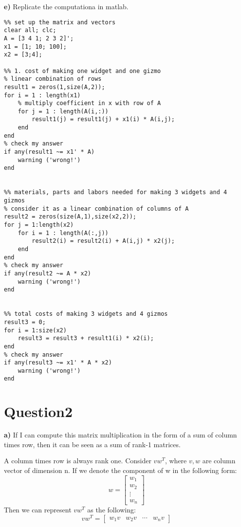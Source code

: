\documentclass[paper=a4, fontsize=11pt]{scrartcl} %
\numberwithin{equation}{section} %
\numberwithin{figure}{section} %
\numberwithin{table}{section} %
\begin{document}
\newpage
\textbf{e)} Replicate the computationa in matlab. 
\begin{lstlisting} 
%% set up the matrix and vectors
clear all; clc;
A = [3 4 1; 2 3 2]';
x1 = [1; 10; 100];
x2 = [3;4];

%% 1. cost of making one widget and one gizmo
% linear combination of rows
result1 = zeros(1,size(A,2));
for i = 1 : length(x1)
    % multiply coefficient in x with row of A
    for j = 1 : length(A(i,:))
        result1(j) = result1(j) + x1(i) * A(i,j);
    end
end
% check my answer
if any(result1 ~= x1' * A)
    warning ('wrong!')
end


%% materials, parts and labors needed for making 3 widgets and 4 gizmos
% consider it as a linear combination of columns of A
result2 = zeros(size(A,1),size(x2,2));
for j = 1:length(x2)
    for i = 1 : length(A(:,j))
        result2(i) = result2(i) + A(i,j) * x2(j);
    end
end
% check my answer
if any(result2 ~= A * x2)
    warning ('wrong!')
end


%% total costs of making 3 widgets and 4 gizmos
result3 = 0;
for i = 1:size(x2)
    result3 = result3 + result1(i) * x2(i);
end
% check my answer
if any(result3 ~= x1' * A * x2)
    warning ('wrong!')
end

\end{lstlisting} 

\newpage
\section*{Question2}

\textbf{a)} If I can compute this matrix multiplication in the form of a sum of column times row, then it can be seen as a sum of rank-1 matrices. 

A column times row is always rank one. Consider $v w^T$, where $v, w$ are column vector of dimension n. If we denote the component of w in the following form:
$$
w = 
\begin{bmatrix}
w_1\\w_2\\ \vdots \\ w_n
\end{bmatrix}
$$
Then we can represent $v w^T$ as the following: 
$$
v w^T = 
\begin{bmatrix}
w_1 v & w_2 v & \cdots & w_n v 
\end{bmatrix}
$$
\end{document}
